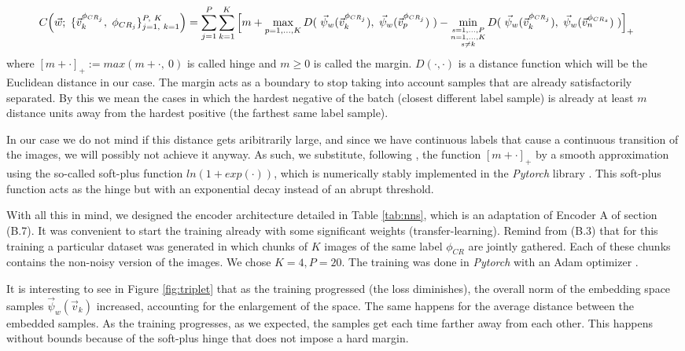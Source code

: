 \documentclass[11pt, a4paper, twoside]{article} %
\begin{document}
\begin{equation}\hspace*{-0.5cm}\small 
C\qty(\vec{w};\ \{\vec{v}_k^{\phi_{CR_j}},\ \phi_{CR_j}\}_{j=1,\ k=1}^{P,\ K})=\sum_{j=1}^P\sum_{k=1}^K\Big[ m+\max_{p=1,...,K}D(\ \vec{\psi}_w(\vec{v}_k^{\phi_{CR_j}}),\ \vec{\psi}_w(\vec{v}_p^{\phi_{CR_j}})\ ) - \min_{\substack{s=1,...,P\\ n=1,...,K\\ s\neq k}}D(\ \vec{\psi}_w(\vec{v}_k^{\phi_{CR_j}}),\ \vec{\psi}_w(\vec{v}_n^{\phi_{CR_s}})\ )\Big]_+\vspace{-0.3cm}
\end{equation}
\newpage
\noindent where $[m+\cdot]_+:=max(m+\cdot,\ 0)$ is called hinge and $m\geq 0$ is called the margin. $D(\cdot,\cdot)$ is a distance function which will be the Euclidean distance in our case. The margin acts as a boundary to stop taking into account samples that are already satisfactorily separated. By this we mean the cases in which the hardest negative of the batch (closest different label sample) is already at least $m$ distance units away from the hardest positive (the farthest same label sample).\vspace{-0.05cm}

In our case we do not mind if this distance gets aribitrarily large, and since we have continuous labels that cause a continuous transition of the images, we will possibly not achieve it anyway. As such, we substitute, following \cite{triplet}, the function $[m+\cdot]_+$ by a smooth approximation using the so-called soft-plus function $ln(1+exp(\cdot))$, which is numerically stably implemented in the {\em Pytorch} library \cite{pytorch}. This soft-plus function acts as the hinge but with an exponential decay instead of an abrupt threshold.\vspace{-0.05cm}

With all this in mind, we designed the encoder architecture detailed in Table \ref{tab:nns}, which is an adaptation of Encoder A of section (B.7). It was convenient to start the training already with some significant weights (transfer-learning). Remind from (B.3) that for this training a particular dataset was generated in which chunks of $K$ images of the same label $\phi_{CR}$ are jointly gathered. Each of these chunks contains the non-noisy version of the images. We chose $K=4,P=20$. The training was done in {\em Pytorch} with an Adam optimizer \cite{adam}.\vspace{-0.05cm}

It is interesting to see in Figure \ref{fig:triplet} that as the training progressed (the loss diminishes), the overall norm of the embedding space samples $\vec{\psi}_w(\vec{v}_k)$ increased, accounting for the enlargement of the space. The same happens for the average distance between the embedded samples. As the training progresses, as we expected, the samples get each time farther away from each other. This happens without bounds because of the soft-plus hinge that does not impose a hard margin.\vspace{-0.05cm}
\end{document}
